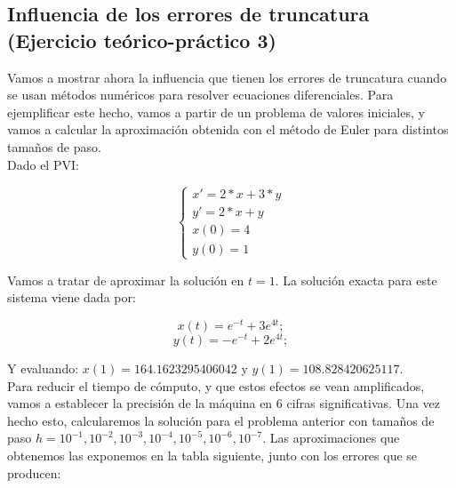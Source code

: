 \documentclass[12pt]{article}       %
\begin{document}
\subsection{Influencia de los errores de truncatura (Ejercicio teórico-práctico 3)}

Vamos a mostrar ahora la influencia que tienen los errores de truncatura cuando se usan métodos numéricos para resolver ecuaciones diferenciales. Para ejemplificar este hecho, vamos a partir de un problema de valores iniciales, y vamos a calcular la aproximación obtenida con el método de Euler para distintos tamaños de paso.\\

Dado el PVI:

$$
\begin{cases}
x' = 2*x + 3 * y\\
y' = 2*x + y \\
x(0) = 4\\
y(0)=1
\end{cases}
$$

Vamos a tratar de aproximar la solución en $t=1$. La solución exacta para este sistema viene dada por:

$$
x(t)=e^{-t}+3e^{4t};
$$
$$
y(t)= -e^{-t}+2e^{4t};
$$

Y evaluando: $x(1)= 164.1623295406042$ y $y(1)=108.828420625117$.\\

Para reducir el tiempo de cómputo, y que estos efectos se vean amplificados, vamos a establecer la precisión de la máquina en 6 cifras significativas. Una vez hecho esto, calcularemos la solución para el problema anterior con tamaños de paso $h = 10^{-1}, 10^{-2}, 10^{-3}, 10^{-4}, 10^{-5}, 10^{-6}, 10^{-7}$. Las aproximaciones que obtenemos las exponemos en la tabla siguiente, junto con los errores que se producen:
\end{document}
